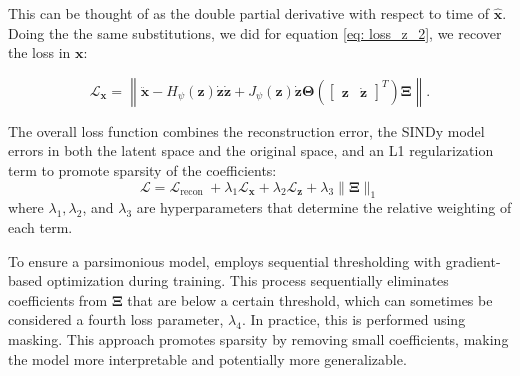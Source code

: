 This can be thought of as the double partial derivative with respect to time of $\hat{\mathbf{x}}$. Doing the the same substitutions, we did for equation \ref{eq: loss_z_2}, we recover the loss in $\mathbf{x}$:

\begin{equation}
    \mathcal{L}_{\mathbf{x}} = \left\| \ddot{\mathbf{x}} -     H_{\psi} (\mathbf{z}) \dot{\mathbf{z}} \dot{\mathbf{z}} + J_{\psi} (\mathbf{z})\dot{\mathbf{z}}\boldsymbol{\Theta}\left(\begin{bmatrix} \mathbf{z} & \dot{\mathbf{z}} \end{bmatrix}^T\right) \boldsymbol{\Xi}   \right\|.
\end{equation}




The overall loss function combines the reconstruction error, the SINDy model errors in both the latent space and the original space, and an L1 regularization term to promote sparsity of the coefficients:
\begin{equation}
    \mathcal{L}=\mathcal{L}_{\text {recon }}+\lambda_1 \mathcal{L}_{\mathbf{x}}+\lambda_2 \mathcal{L}_{\mathbf{z}}+\lambda_3\|\mathbf{\Xi}\|_1
\end{equation}
where $\lambda_1, \lambda_2$, and $\lambda_3$ are hyperparameters that determine the relative weighting of each term.

To ensure a parsimonious model, \textcite{Champion_2019} employs sequential thresholding with gradient-based optimization during training. This process sequentially eliminates coefficients from $\boldsymbol{\Xi}$ that are below a certain threshold, which can sometimes be considered a fourth loss parameter, $\lambda_4$. In practice, this is performed using masking. This approach promotes sparsity by removing small coefficients, making the model more interpretable and potentially more generalizable.

